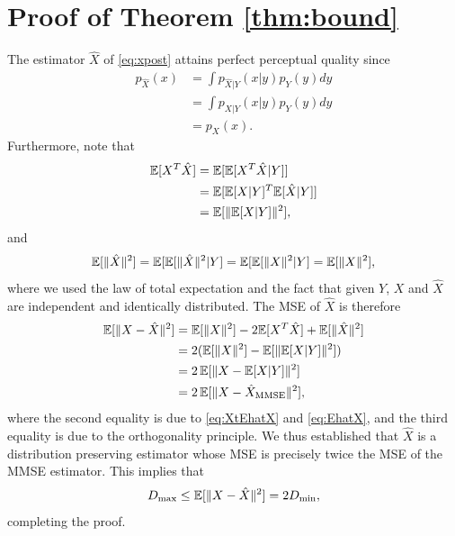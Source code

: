 \section{Proof of Theorem \ref{thm:bound}}\label{ap:boundProof}
The estimator $\hat{X}$ of \eqref{eq:xpost} attains perfect perceptual quality since
\begin{align}\label{eq:sameDist}
p_{\hat{X}}(x) &= \int p_{\hat{X}|Y}(x|y) p_Y(y) dy \nonumber \\
&= \int p_{X|Y}(x|y) p_Y(y) dy \nonumber\\
&= p_X(x).
\end{align}
Furthermore, note that
\begin{align}\label{eq:XtEhatX}
\mathbb{E}[ X^T\hat{X}] &= \mathbb{E}[ \mathbb{E}[X^T\hat{X}|Y] ] \nonumber\\
&= \mathbb{E}[ \mathbb{E}[X|Y]^T\mathbb{E}[\hat{X} |Y] ] \nonumber \\
&= \mathbb{E}[\| \mathbb{E}[X|Y]\|^2],
\end{align}
and
\begin{align}\label{eq:EhatX}
\mathbb{E}[\|\hat{X}\|^2] = \mathbb{E}[ \mathbb{E}[\|\hat{X}\|^2|Y] = \mathbb{E}[ \mathbb{E}[\|X\|^2|Y] = \mathbb{E}[\|X\|^2],
\end{align}
where we used the law of total expectation and the fact that given $Y$, $X$ and $\hat{X}$ are independent and identically distributed. The MSE of $\hat{X}$ is therefore
\begin{align}
\mathbb{E}[\| X-\hat{X}\|^2] &= \mathbb{E}[\|X\|^2] -2 \mathbb{E}[ X^T\hat{X}] + \mathbb{E}[\|\hat{X}\|^2] \nonumber \\
&= 2(\mathbb{E}[\|X\|^2] - \mathbb{E}[ \|\mathbb{E}[X|Y]\|^2]) \nonumber \\
&= 2\,\mathbb{E}[\| X - \mathbb{E}[X|Y] \|^2] \nonumber \\
&= 2\,\mathbb{E}[\| X - \hat{X}_{\text{MMSE}} \|^2],
\end{align}
where the second equality is due to \eqref{eq:XtEhatX} and \eqref{eq:EhatX}, and the third equality is due to the orthogonality principle. We thus established that $\hat{X}$ is a distribution preserving estimator whose MSE is precisely twice the MSE of the MMSE estimator. This implies that
\begin{equation}
D_{\max} \le \mathbb{E}[\| X-\hat{X} \|^2]  =  2 D_{\min},
\end{equation}
completing the proof.

